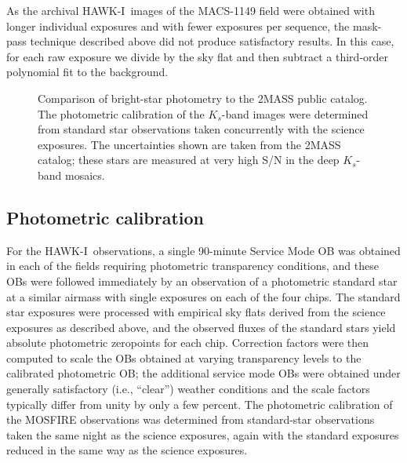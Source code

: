 \documentclass[preprint2]{aastex6}
\gdef\HAWKI{\mbox{HAWK-I}}
\begin{document}
As the archival \HAWKI\ images of the MACS-1149 field were obtained with longer individual exposures and with fewer exposures per sequence, the mask-pass technique described above did not produce satisfactory results.  In this case, for each raw exposure we divide by the sky flat and then subtract a third-order polynomial fit to the background.  

\begin{figure}[!t]
\caption{Comparison of bright-star photometry to the 2MASS public catalog.  The photometric calibration of the $K_s$-band images were determined from standard star observations taken concurrently with the science exposures.  The uncertainties shown are taken from the 2MASS catalog; these stars are measured at very high S/N in the deep $K_s$-band mosaics.  \label{fig:2mass}}  
\end{figure}

\subsection{Photometric calibration}
\label{s:calib}

For the \HAWKI\ observations, a single 90-minute Service Mode OB was obtained in each of the fields requiring photometric transparency conditions, and these OBs were followed immediately by an observation of a photometric standard star at a similar airmass with single exposures on each of the four chips.  The standard star exposures were processed with empirical sky flats derived from the science exposures as described above, and the observed fluxes of the standard stars yield absolute photometric zeropoints for each chip.  Correction factors were then computed to scale the OBs obtained at varying transparency levels to the calibrated photometric OB; the additional service mode OBs were obtained under generally satisfactory (i.e., ``clear'') weather conditions and the scale factors typically differ from unity by only a few percent.  The photometric calibration of the MOSFIRE observations was determined from standard-star observations taken the same night as the science exposures, again with the standard exposures reduced in the same way as the science exposures.
\end{document}
